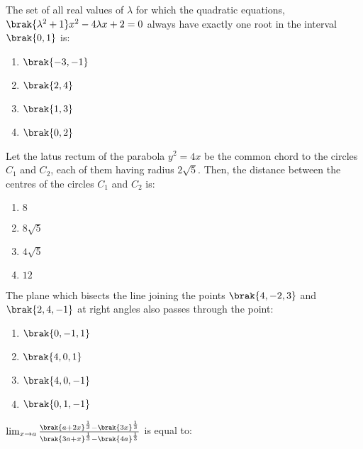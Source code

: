 \item The set of all real values of $\lambda$ for which the quadratic equations, $\brak{\lambda^2 + 1}x^2 - 4\lambda x + 2 = 0$ always have exactly one root in the interval $\brak{0, 1}$ is: \hfill {}

        
          \begin{multicols}{4}
\begin{enumerate}
    \item $\brak{-3, -1}$
    \item $\brak{2, 4}$
    \item $\brak{1, 3}$
    \item $\brak{0, 2}$
\end{enumerate}
\end{multicols}

\item Let the latus rectum of the parabola $y^2 = 4x$ be the common chord to the circles $C_1$ and $C_2$, each of them having radius $2\sqrt{5}$. Then, the distance between the centres of the circles $C_1$ and $C_2$ is: \hfill {}


\begin{multicols}{4}
\begin{enumerate}
    \item $8$
    \item $8\sqrt{5}$
    \item $4\sqrt{5}$
    \item $12$
\end{enumerate}
\end{multicols}

\item The plane which bisects the line joining the points $\brak{4, -2, 3}$ and $\brak{2, 4, -1}$ at right angles also passes through the point:  \hfill {}


  \begin{multicols}{4}
\begin{enumerate}
    \item $\brak{0, -1, 1}$
    \item $\brak{4, 0, 1}$
    \item $\brak{4, 0, -1}$
    \item $\brak{0, 1, -1}$
\end{enumerate}
\end{multicols}

\item $\lim_{x \to a} \frac{\brak{a + 2x}^{\frac{1}{3}} - \brak{3x}^{\frac{1}{3}}}{\brak{3a + x}^{\frac{1}{3}} - \brak{4a}^{\frac{1}{3}}}$ is equal to:  \hfill {}

